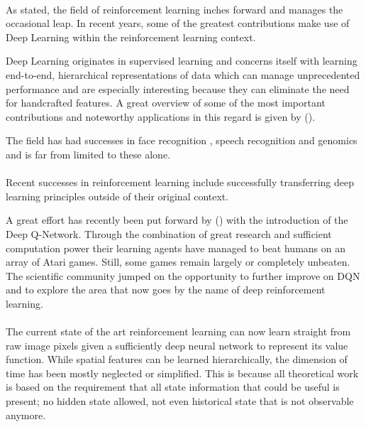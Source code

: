 \paragraph{}
As stated,
the field of reinforcement learning
inches forward and manages the occasional leap.
In recent years,
some of the greatest contributions
make use of Deep Learning
within the reinforcement learning context.

Deep Learning originates in supervised learning
and concerns itself with learning
end-to-end, hierarchical representations of data
which can manage unprecedented performance
and are especially interesting
because they can eliminate the need for handcrafted features.
A great overview of
some of the most important contributions
and noteworthy applications
in this regard is given by
\citeauthor{Y.2015a} (\citeyear{Y.2015a}).

The field has had successes in
face recognition
\parencite{lawrence1997face,wolf2014deepface},
speech recognition
\parencite{dahl2012context,graves2013speech}
and
genomics
\parencite{leung2014deep,xiong2015human}
and is far from limited to these alone.

\paragraph{}
Recent successes in reinforcement learning
include successfully transferring deep learning principles
outside of their original context.

A great effort has recently been put forward by
\citeauthor{Mnih2015} (\citeyear{Mnih2013,Mnih2015})
with the introduction of the Deep Q-Network.
Through the combination of great research and sufficient computation power
their learning agents have managed to beat humans
on an array of Atari games.
Still, some games remain largely or completely unbeaten.
The scientific community jumped
on the opportunity to further improve on DQN
and to explore the area
that now goes by the name of deep reinforcement learning.

\paragraph{}
The current state of the art reinforcement learning
can now learn straight from raw image pixels
given a sufficiently deep neural network
to represent its value function.
While spatial features can be learned hierarchically,
the dimension of time has been mostly neglected or simplified.
This is because all theoretical work is based
on the requirement that all state information that
could be useful is present;
no hidden state allowed,
not even historical state that is not observable anymore.

